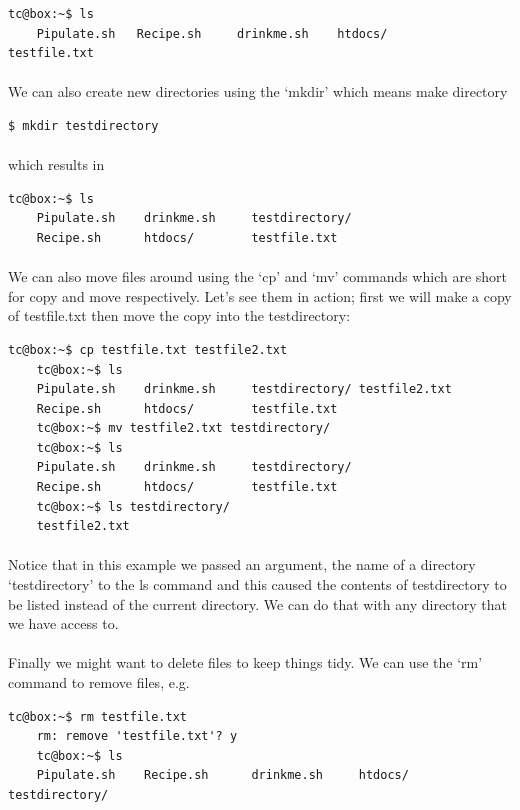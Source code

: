 \documentclass[12pt, a4paper, twoside]{book}
\begin{document}
\begin{lstlisting}[style=DOS]
    tc@box:~$ ls
    Pipulate.sh   Recipe.sh     drinkme.sh    htdocs/       testfile.txt
\end{lstlisting}

\paragraph{} We can also create new directories using the `mkdir' which means make directory
\begin{lstlisting}[style=DOS]
    $ mkdir testdirectory
\end{lstlisting}

\paragraph{} which results in

\begin{lstlisting}[style=DOS]
    tc@box:~$ ls
    Pipulate.sh    drinkme.sh     testdirectory/
    Recipe.sh      htdocs/        testfile.txt
\end{lstlisting}
\paragraph{} We can also move files around using the `cp' and `mv' commands which are short for copy and move respectively. Let's see them in action; first we will make a copy of testfile.txt then move the copy into the testdirectory:
\begin{lstlisting}[style=DOS]
    tc@box:~$ cp testfile.txt testfile2.txt
    tc@box:~$ ls
    Pipulate.sh    drinkme.sh     testdirectory/ testfile2.txt
    Recipe.sh      htdocs/        testfile.txt
    tc@box:~$ mv testfile2.txt testdirectory/
    tc@box:~$ ls
    Pipulate.sh    drinkme.sh     testdirectory/
    Recipe.sh      htdocs/        testfile.txt
    tc@box:~$ ls testdirectory/
    testfile2.txt
\end{lstlisting}

\paragraph{} Notice that in this example we passed an argument, the name of a directory `testdirectory' to the ls command and this caused the contents of testdirectory to be listed instead of the current directory. We can do that with any directory that we have access to.

\paragraph{} Finally we might want to delete files to keep things tidy. We can use the `rm' command to remove files, e.g.
\begin{lstlisting}[style=DOS]
    tc@box:~$ rm testfile.txt 
    rm: remove 'testfile.txt'? y
    tc@box:~$ ls
    Pipulate.sh    Recipe.sh      drinkme.sh     htdocs/        testdirectory/
\end{lstlisting}
\end{document}

